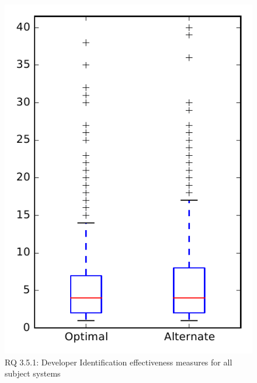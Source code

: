
\begin{figure}
\centering
\includegraphics[height=0.4\textheight]{figures/combo/dit_rq1_overview}
\caption{RQ 3.5.1: Developer Identification effectiveness measures for all subject systems}
\label{fig:dit:rq1:overview}
\end{figure}
